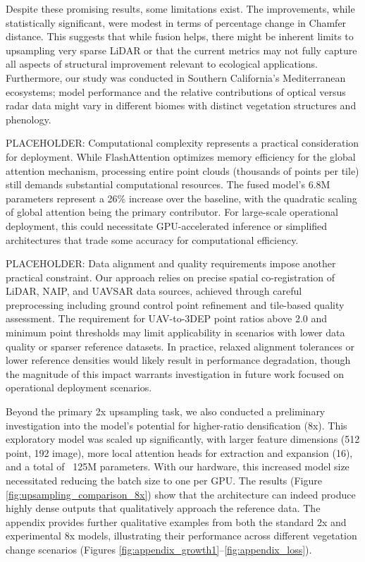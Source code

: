 \documentclass[remotesensing,article,submit,pdftex,moreauthors]{Definitions/mdpi}
\begin{document}
Despite these promising results, some limitations exist. The improvements, while statistically significant, were modest in terms of percentage change in Chamfer distance. This suggests that while fusion helps, there might be inherent limits to upsampling very sparse LiDAR or that the current metrics may not fully capture all aspects of structural improvement relevant to ecological applications. Furthermore, our study was conducted in Southern California's Mediterranean ecosystems; model performance and the relative contributions of optical versus radar data might vary in different biomes with distinct vegetation structures and phenology.

PLACEHOLDER: Computational complexity represents a practical consideration for deployment. While FlashAttention optimizes memory efficiency for the global attention mechanism, processing entire point clouds (thousands of points per tile) still demands substantial computational resources. The fused model's 6.8M parameters represent a 26\% increase over the baseline, with the quadratic scaling of global attention being the primary contributor. For large-scale operational deployment, this could necessitate GPU-accelerated inference or simplified architectures that trade some accuracy for computational efficiency.

PLACEHOLDER: Data alignment and quality requirements impose another practical constraint. Our approach relies on precise spatial co-registration of LiDAR, NAIP, and UAVSAR data sources, achieved through careful preprocessing including ground control point refinement and tile-based quality assessment. The requirement for UAV-to-3DEP point ratios above 2.0 and minimum point thresholds may limit applicability in scenarios with lower data quality or sparser reference datasets. In practice, relaxed alignment tolerances or lower reference densities would likely result in performance degradation, though the magnitude of this impact warrants investigation in future work focused on operational deployment scenarios.

Beyond the primary 2x upsampling task, we also conducted a preliminary investigation into the model's potential for higher-ratio densification (8x). This exploratory model was scaled up significantly, with larger feature dimensions (512 point, 192 image), more local attention heads for extraction and expansion (16), and a total of ~125M parameters. With our hardware, this increased model size necessitated reducing the batch size to one per GPU. The results (Figure \ref{fig:upsampling_comparison_8x}) show that the architecture can indeed produce highly dense outputs that qualitatively approach the reference data. The appendix provides further qualitative examples from both the standard 2x and experimental 8x models, illustrating their performance across different vegetation change scenarios (Figures \ref{fig:appendix_growth1}--\ref{fig:appendix_loss}).
\end{document}
